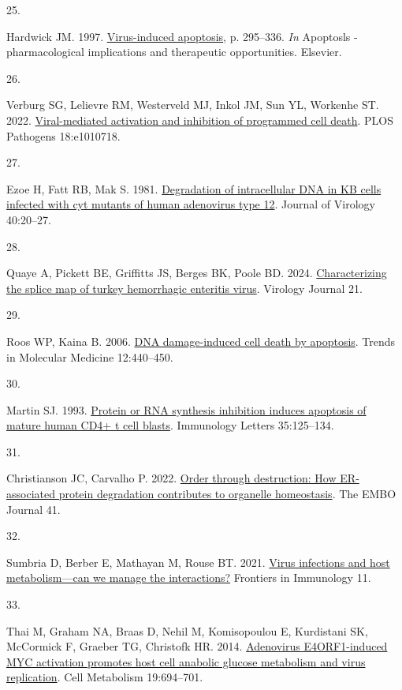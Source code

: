 \documentclass[
]{article}
\newlength{\cslhangindent}
\newlength{\csllabelwidth}
\newenvironment{CSLReferences}[2] %
 {\begin{list}{}{%
  \setlength{\itemindent}{0pt}
  \setlength{\leftmargin}{0pt}
  \setlength{\parsep}{0pt}
  \ifodd #1
   \setlength{\leftmargin}{\cslhangindent}
   \setlength{\itemindent}{-1\cslhangindent}
  \fi
  \setlength{\itemsep}{#2\baselineskip}}}
 {\end{list}}
\newcommand{\CSLLeftMargin}[1]{\parbox[t]{\csllabelwidth}{\strut#1\strut}}
\newcommand{\CSLRightInline}[1]{\parbox[t]{\linewidth - \csllabelwidth}{\strut#1\strut}}
\begin{document}
\begin{CSLReferences}{0}{1}
\CSLLeftMargin{25. }%
\CSLRightInline{Hardwick JM. 1997.
\href{https://doi.org/10.1016/s1054-3589(08)61063-7}{Virus-induced
apoptosis}, p. 295--336. \emph{In} Apoptosls - pharmacological
implications and therapeutic opportunities. Elsevier.}

\CSLLeftMargin{26. }%
\CSLRightInline{Verburg SG, Lelievre RM, Westerveld MJ, Inkol JM, Sun
YL, Workenhe ST. 2022.
\href{https://doi.org/10.1371/journal.ppat.1010718}{Viral-mediated
activation and inhibition of programmed cell death}. PLOS Pathogens
18:e1010718.}

\CSLLeftMargin{27. }%
\CSLRightInline{Ezoe H, Fatt RB, Mak S. 1981.
\href{https://doi.org/10.1128/jvi.40.1.20-27.1981}{Degradation of
intracellular DNA in KB cells infected with cyt mutants of human
adenovirus type 12}. Journal of Virology 40:20--27.}

\CSLLeftMargin{28. }%
\CSLRightInline{Quaye A, Pickett BE, Griffitts JS, Berges BK, Poole BD.
2024. \href{https://doi.org/10.1186/s12985-024-02449-0}{Characterizing
the splice map of turkey hemorrhagic enteritis virus}. Virology Journal
21.}

\CSLLeftMargin{29. }%
\CSLRightInline{Roos WP, Kaina B. 2006.
\href{https://doi.org/10.1016/j.molmed.2006.07.007}{DNA damage-induced
cell death by apoptosis}. Trends in Molecular Medicine 12:440--450.}

\CSLLeftMargin{30. }%
\CSLRightInline{Martin SJ. 1993.
\href{https://doi.org/10.1016/0165-2478(93)90080-l}{Protein or RNA
synthesis inhibition induces apoptosis of mature human CD4+ t cell
blasts}. Immunology Letters 35:125--134.}

\CSLLeftMargin{31. }%
\CSLRightInline{Christianson JC, Carvalho P. 2022.
\href{https://doi.org/10.15252/embj.2021109845}{Order through
destruction: How ER‐associated protein degradation contributes to
organelle homeostasis}. The EMBO Journal 41.}

\CSLLeftMargin{32. }%
\CSLRightInline{Sumbria D, Berber E, Mathayan M, Rouse BT. 2021.
\href{https://doi.org/10.3389/fimmu.2020.594963}{Virus infections and
host metabolism---can we manage the interactions?} Frontiers in
Immunology 11.}

\CSLLeftMargin{33. }%
\CSLRightInline{Thai M, Graham NA, Braas D, Nehil M, Komisopoulou E,
Kurdistani SK, McCormick F, Graeber TG, Christofk HR. 2014.
\href{https://doi.org/10.1016/j.cmet.2014.03.009}{Adenovirus
E4ORF1-induced MYC activation promotes host cell anabolic glucose
metabolism and virus replication}. Cell Metabolism 19:694--701.}


\end{CSLReferences}
\end{document}
